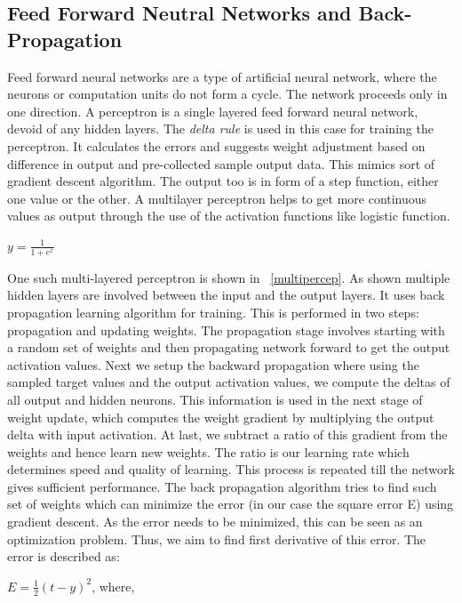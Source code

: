 \subsection{Feed Forward Neutral Networks and Back-Propagation}
	Feed forward neural networks \parencite{ffwdnn} are a type of artificial neural network, where the neurons or computation units do not form a cycle. The network proceeds only in one direction. A perceptron is a single layered feed forward neural network, devoid of any hidden layers. The \textit{delta rule} is used in this case for training the perceptron. It calculates the errors and suggests weight adjustment based on difference in output and pre-collected sample output data. This mimics sort of gradient descent algorithm. The output too is in form of a step function, either one value or the other. A multilayer perceptron helps to get more continuous values as output through the use of the activation functions like logistic function. 
 
\begin{center}

$y=\frac{1}{1+e^{x}}$

\end{center}
One such multi-layered perceptron is shown in  ~\autoref{multipercep}. As shown multiple hidden layers are involved between the input and the output layers. It uses back propagation learning algorithm for training. This is performed in two steps: propagation and updating weights. The propagation stage involves starting with a random set of weights and then propagating network forward to get the output activation values. Next we setup the backward propagation where using the sampled target values and the output activation values, we compute the deltas of all output and hidden neurons. This information is used in the next stage of weight update, which computes the weight gradient by multiplying the output delta with input activation. At last, we subtract a ratio of this gradient from the weights and hence learn new weights. The ratio is our learning rate which determines speed and quality of learning. This process is repeated till the network gives sufficient performance. The back propagation algorithm tries to find such set of weights which can minimize the error (in our case the square error E) using gradient descent. As the error needs to be minimized, this can be seen as an optimization problem. Thus, we aim to find first derivative of this error. The error is described as:

\begin{center}
$E=\frac{1}{2} {(t-y)}^2$, where,
\end{center}

